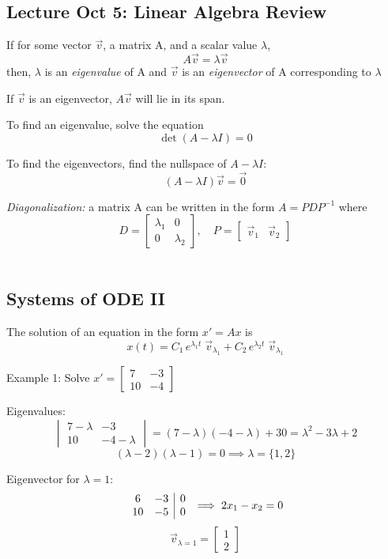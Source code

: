 \documentclass[12pt]{article}
\begin{document}
\subsection*{Lecture Oct 5: Linear Algebra Review}
If for some vector $\vec{v}$, a matrix A, and a scalar value $\lambda$, 
\[A\vec{v} = \lambda\vec{v}\]
then,
$\lambda$ is an \emph{eigenvalue} of A and $\vec{v}$ is an \emph{eigenvector} of A corresponding to $\lambda$

If $\vec{v}$ is an eigenvector, $A\vec{v}$ will lie in its span. 

To find an eigenvalue, solve the equation
\[\det (A - \lambda I) = 0\]

To find the eigenvectors, find the nullspace of $A - \lambda I$: 
\[(A - \lambda I)\vec{v} = \vec{0}\]

\emph{Diagonalization:} a matrix A can be written in the form $A = PDP^{-1}$ where
\[D = \begin{bmatrix}
    \lambda_1 & 0\\
    0 & \lambda_2
\end{bmatrix}, \quad P = \begin{bmatrix}
    \vec{v}_1 & \vec{v}_2
\end{bmatrix}\]\

\subsection*{Systems of ODE II}
The solution of an equation in the form $x' = Ax$ is 
\[x(t) = C_1 \, e^{\lambda_1 t}\; \vec{v}_{\lambda_1} + C_2 \, e^{\lambda_2 t}\; \vec{v}_{\lambda_1}\]

Example 1: Solve $x' = \begin{bmatrix}
    7 & -3\\
    10 & -4
\end{bmatrix}$

Eigenvalues:
\[\begin{vmatrix}
    7 - \lambda & -3\\
    10 & -4 - \lambda
\end{vmatrix} = (7- \lambda)(-4-\lambda) +30 = \lambda^2 - 3\lambda + 2\]
\[(\lambda - 2)(\lambda - 1) = 0 \implies \lambda = \{1, 2\}\]

Eigenvector for $\lambda = 1$:
\[\begin{array}{c c | c}
    6 & -3 & 0\\
    10 & -5 & 0
\end{array} \implies 2x_1 - x_2 = 0\]
\[\vec{v}_{\lambda = 1} = \begin{bmatrix}
    1\\
    2
\end{bmatrix}\]
\end{document}
